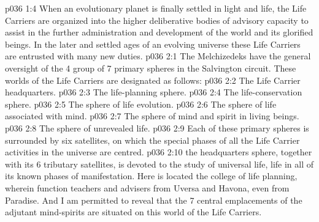 \vs p036 1:4 When an evolutionary planet is finally settled in light and life, the Life Carriers are organized into the higher deliberative bodies of advisory capacity to assist in the further administration and development of the world and its glorified beings. In the later and settled ages of an evolving universe these Life Carriers are entrusted with many new duties.
\vs p036 2:1 The Melchizedeks have the general oversight of the 4 group of 7 primary spheres in the Salvington circuit. These worlds of the Life Carriers are designated as follows:
\vs p036 2:2 \bibnobreakspace The Life Carrier headquarters.
\vs p036 2:3 \bibnobreakspace The life\hyp{}planning sphere.
\vs p036 2:4 \bibnobreakspace The life\hyp{}conservation sphere.
\vs p036 2:5 \bibnobreakspace The sphere of life evolution.
\vs p036 2:6 \bibnobreakspace The sphere of life associated with mind.
\vs p036 2:7 \bibnobreakspace The sphere of mind and spirit in living beings.
\vs p036 2:8 \bibnobreakspace The sphere of unrevealed life.
\vs p036 2:9 \pc Each of these primary spheres is surrounded by six satellites, on which the special phases of all the Life Carrier activities in the universe are centred.
\vs p036 2:10 \pc {} the headquarters sphere, together with its 6 tributary satellites, is devoted to the study of universal life, life in all of its known phases of manifestation. Here is located the college of life planning, wherein function teachers and advisers from Uversa and Havona, even from Paradise. And I am permitted to reveal that the 7 central emplacements of the adjutant mind\hyp{}spirits are situated on this world of the Life Carriers.

